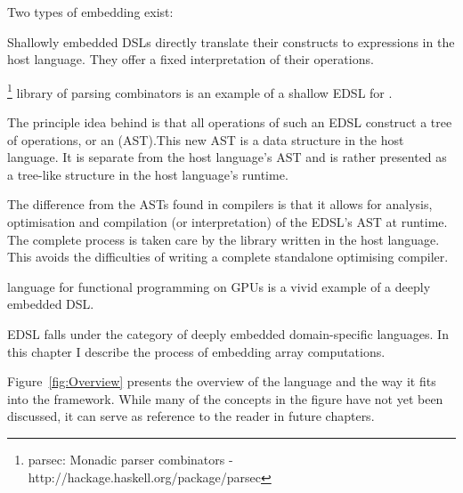 \documentclass[preamble.tex]{subfiles}
\begin{document}
Two types of embedding exist:
\begin{description}
\item {}

Shallowly embedded DSLs directly translate their constructs to expressions in the host language. They offer a fixed interpretation of their operations.

\footnote{parsec: Monadic parser combinators - http://hackage.haskell.org/package/parsec} library of parsing combinators is an example of a shallow EDSL for \Haskell.

\item {} 

The principle idea behind  is that all operations of such an EDSL construct a tree of operations, or an  (AST).\iast This new AST is a data structure in the host language. It is separate from the host language's AST and is rather presented as a tree-like structure in the host language's runtime.

The difference from the ASTs found in compilers is that it allows for analysis, optimisation and compilation (or interpretation) of the EDSL's AST at runtime. The complete process is taken care by the library written in the host language. This avoids the difficulties of writing a complete standalone optimising compiler.

 language for functional programming on GPUs \cite{CKL+11} is a vivid example of a deeply embedded DSL.
\end{description}

\LiveFusion EDSL falls under the category of deeply embedded domain-specific languages. In this chapter I describe the process of embedding array computations.

Figure~\ref{fig:Overview} presents the overview of the \LiveFusion language and the way it fits into the  framework. While many of the concepts in the figure have not yet been discussed, it can serve as reference to the reader in future chapters.
\end{document}
